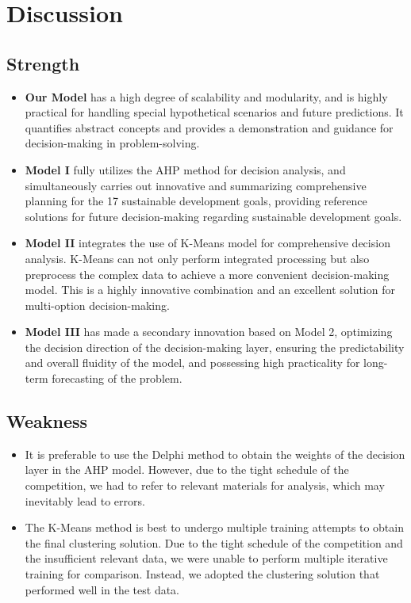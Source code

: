 
\section{Discussion}

\subsection{Strength}
\begin{itemize}
    \item \textbf{Our Model} has a high degree of scalability and modularity, and is highly practical for handling special hypothetical scenarios and future predictions. It quantifies abstract concepts and provides a demonstration and guidance for decision-making in problem-solving.
    \item \textbf{Model I} fully utilizes the AHP method for decision analysis, and simultaneously carries out innovative and summarizing comprehensive planning for the 17 sustainable development goals, providing reference solutions for future decision-making regarding sustainable development goals.
    \item \textbf{Model II} integrates the use of K-Means model for comprehensive decision analysis. K-Means can not only perform integrated processing but also preprocess the complex data to achieve a more convenient decision-making model. This is a highly innovative combination and an excellent solution for multi-option decision-making.
    \item \textbf{Model III} has made a secondary innovation based on Model 2, optimizing the decision direction of the decision-making layer, ensuring the predictability and overall fluidity of the model, and possessing high practicality for long-term forecasting of the problem.
\end{itemize}



\subsection{Weakness}
\begin{itemize}
    \item It is preferable to use the Delphi method to obtain the weights of the decision layer in the AHP model. However, due to the tight schedule of the competition, we had to refer to relevant materials for analysis, which may inevitably lead to errors.
    \item The K-Means method is best to undergo multiple training attempts to obtain the final clustering solution. Due to the tight schedule of the competition and the insufficient relevant data, we were unable to perform multiple iterative training for comparison. Instead, we adopted the clustering solution that performed well in the test data.
\end{itemize}


